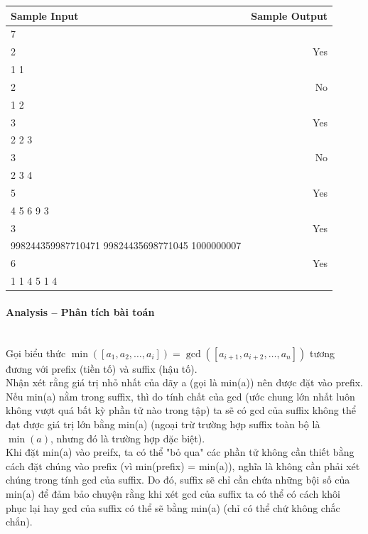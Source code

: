 \documentclass{article}
\begin{document}
\begin{table}[h]
    \centering
    \begin{tabular}{|l|r|}
        \hline
        \rowcolor{gray!30}
        \textbf{Sample Input} & \textbf{Sample Output} \\
        \hline
        7 & \\
        2 & Yes \\
        1 1 & \\
        2 & No \\
        1 2 & \\
        3 & Yes \\
        2 2 3 & \\
        3 & No \\
        2 3 4 & \\
        5 & Yes \\
        4 5 6 9 3 & \\
        3 & Yes \\
        998244359987710471 99824435698771045 1000000007 & \\
        6 & Yes \\
        1 1 4 5 1 4 & \\
        \hline
    \end{tabular}
\end{table}

\paragraph{Analysis -- Phân tích bài toán} \mbox{} \\

Gọi biểu thức $\min([a_1, a_2, \ldots, a_i]) = \gcd([a_{i+1}, a_{i+2}, \ldots, a_n])$ tương đương với prefix (tiền tố) và suffix (hậu tố).\\

Nhận xét rằng giá trị nhỏ nhất của dãy a (gọi là min(a)) nên được đặt vào prefix. Nếu min(a) nằm trong suffix, thì do tính chất của gcd (ước chung lớn nhất luôn không vượt quá bất kỳ phần tử nào trong tập) ta sẽ có gcd của suffix không thể đạt được giá trị lớn bằng min(a) (ngoại trừ trường hợp suffix toàn bộ là $\min(a)$, nhưng đó là trường hợp đặc biệt).\\

Khi đặt min(a) vào preifx, ta có thể "bỏ qua" các phần tử không cần thiết bằng cách đặt chúng vào prefix (vì min(prefix) = min(a)), nghĩa là không cần phải xét chúng trong tính gcd của suffix. Do đó, suffix sẽ chỉ cần chứa những bội số của min(a) để đảm bảo chuyện rằng khi xét gcd của suffix ta có thể có cách khôi phục lại hay gcd của suffix có thể sẽ bằng min(a) (chỉ có thể chứ không chắc chắn).\\
\end{document}
